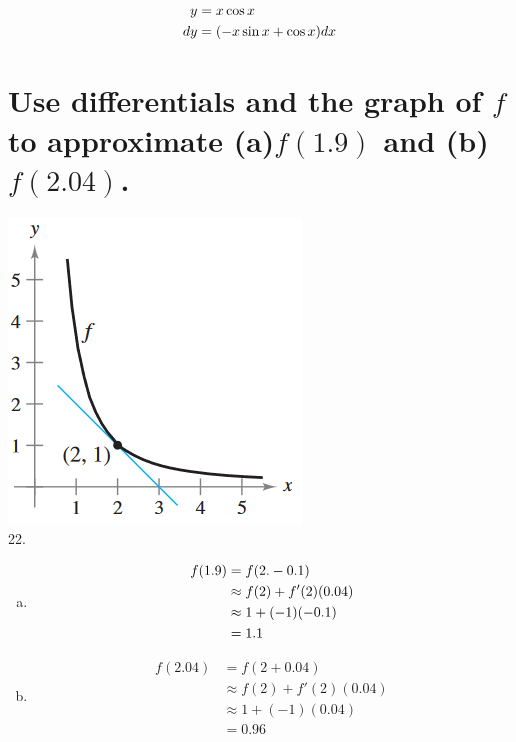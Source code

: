 \documentclass[11pt]{article}
\newcommand*{\next}{\noindent}
\newcommand*{\set}{\setcounter{equation}{0}}
\begin{document}
\next
18\begin{align}
    \set
    y&=x\cos x\\
    dy&=(-x\sin x+\cos x)dx
\end{align}

\section{Use differentials and the graph of $f$ to approximate (a)$f(1.9)$ and (b)$f(2.04)$.}
\includegraphics{22.png}\\
22.\begin{enumerate}[(a)]
    \item
        \begin{align}
        \set
        f(1.9)&=f(2.-0.1)\\
        &\approx f(2)+f'(2)(0.04)\\
        &\approx 1+(-1)(-0.1)\\
        &=1.1            
        \end{align}
    \item
        \begin{align}
        f(2.04)&=f(2+0.04)\\
        &\approx f(2)+f'(2)(0.04)\\
        &\approx 1+(-1)(0.04)\\
        &=0.96
        \end{align}
\end{enumerate}
\end{document}
